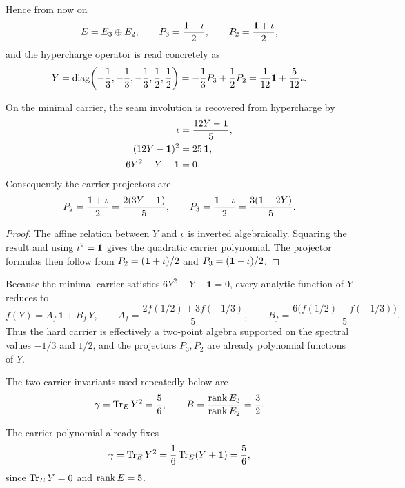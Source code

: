 Hence from now on
\[
E=E_3\oplus E_2,
\qquad
P_3=\frac{\mathbf 1-\iota}{2},
\qquad
P_2=\frac{\mathbf 1+\iota}{2},
\]
and the hypercharge operator is read concretely as
\begin{equation}
\label{eq:explicit-hypercharge}
Y
=
\mathrm{diag}\!\left(-\frac13,-\frac13,-\frac13,\frac12,\frac12\right)
=
-\frac13 P_3+\frac12 P_2
=
\frac1{12}\mathbf 1+\frac5{12}\iota.
\end{equation}

\begin{lemma}
On the minimal carrier, the seam involution is recovered from hypercharge by
\begin{align}
\iota&=\frac{12Y-\mathbf 1}{5},
\label{eq:hypercharge-seam-inversion}\\
(12Y-\mathbf 1)^2&=25\,\mathbf 1,
\nonumber\\
6Y^2-Y-\mathbf 1&=0.
\label{eq:carrier-polynomial}
\end{align}
Consequently the carrier projectors are
\[
P_2=\frac{\mathbf 1+\iota}{2}=\frac{2(3Y+\mathbf 1)}{5},
\qquad
P_3=\frac{\mathbf 1-\iota}{2}=\frac{3(\mathbf 1-2Y)}{5}.
\]
\end{lemma}

\begin{proof}
The affine relation between $Y$ and $\iota$ is inverted algebraically. Squaring the result and using $\iota^2=\mathbf 1$ gives the quadratic carrier polynomial. The projector formulas then follow from $P_2=(\mathbf 1+\iota)/2$ and $P_3=(\mathbf 1-\iota)/2$.
\end{proof}

\begin{remark}
Because the minimal carrier satisfies $6Y^2-Y-\mathbf 1=0$, every analytic function of $Y$ reduces to
\[
f(Y)=A_f\,\mathbf 1+B_f\,Y,
\qquad
A_f=\frac{2f(1/2)+3f(-1/3)}{5},
\qquad
B_f=\frac{6\bigl(f(1/2)-f(-1/3)\bigr)}{5}.
\]
Thus the hard carrier is effectively a two-point algebra supported on the spectral values $-1/3$ and $1/2$, and the projectors $P_3,P_2$ are already polynomial functions of $Y$.
\end{remark}

The two carrier invariants used repeatedly below are
\[
\gamma=\operatorname{Tr}_EY^2=\frac56,
\qquad
B=\frac{\operatorname{rank} E_3}{\operatorname{rank} E_2}=\frac32.
\]
\begin{corollary}
The carrier polynomial already fixes
\[
\gamma=\operatorname{Tr}_EY^2=\frac16\operatorname{Tr}_E(Y+\mathbf 1)=\frac56,
\]
since $\operatorname{Tr}_EY=0$ and $\operatorname{rank} E=5$.
\end{corollary}

